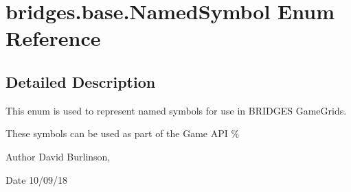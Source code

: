 \hypertarget{enumbridges_1_1base_1_1_named_symbol}{}\section{bridges.\+base.\+Named\+Symbol Enum Reference}
\label{enumbridges_1_1base_1_1_named_symbol}


\subsection{Detailed Description}
This enum is used to represent named symbols for use in B\+R\+I\+D\+G\+ES Game\+Grids. 

These symbols can be used as part of the Game A\+PI \% \begin{DoxyAuthor}{Author}
David Burlinson, 
\end{DoxyAuthor}
\begin{DoxyDate}{Date}
10/09/18 
\end{DoxyDate}
